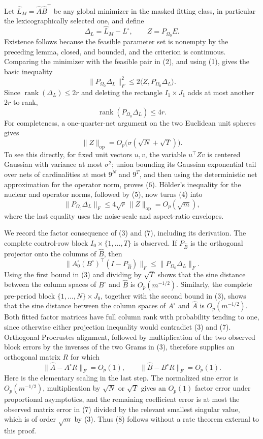 Let \(\widehat L_M=\widehat A\widehat B^{\top}\) be any global minimizer in the masked fitting class, in particular the lexicographically selected one, and define
\[
 \Delta_L=\widehat L_M-L^\circ,\qquad Z=P_{\Omega_0}E.
\]
Existence follows because the feasible parameter set is nonempty by the preceding lemma, closed, and bounded, and the criterion is continuous.  Comparing the minimizer with the feasible pair in (2), and using (1), gives the basic inequality
\[
 \|P_{\Omega_0}\Delta_L\|_F^2
 \leq 2\langle Z,P_{\Omega_0}\Delta_L\rangle.
\tag{4}
\]
Since \(\operatorname{rank}(\Delta_L)\leq2r\) and deleting the rectangle \(I_1\times J_1\) adds at most another \(2r\) to rank,
\[
 \operatorname{rank}(P_{\Omega_0}\Delta_L)\leq4r.
\tag{5}
\]
For completeness, a one-quarter-net argument on the two Euclidean unit spheres gives
\[
 \|Z\|_{\mathrm{op}}=O_p\bigl(\sigma(\sqrt N+\sqrt T)\bigr).
\tag{6}
\]
To see this directly, for fixed unit vectors \(u,v\), the variable \(u^{\top}Zv\) is centered Gaussian with variance at most \(\sigma^2\); union bounding its Gaussian exponential tail over nets of cardinalities at most \(9^N\) and \(9^T\), and then using the deterministic net approximation for the operator norm, proves (6).  Hölder's inequality for the nuclear and operator norms, followed by (5), now turns (4) into
\[
 \|P_{\Omega_0}\Delta_L\|_F
 \leq4\sqrt r\,\|Z\|_{\mathrm{op}}
 =O_p(\sqrt m),
\tag{7}
\]
where the last equality uses the noise-scale and aspect-ratio envelopes.

We record the factor consequence of (3) and (7), including its derivation.  The complete control-row block \(I_0\times\{1,\ldots,T\}\) is observed.  If \(P_{\widehat B}\) is the orthogonal projector onto the columns of \(\widehat B\), then
\[
 \|A^\circ_0(B^\circ)^{\top}(I-P_{\widehat B})\|_F
 \leq \|P_{\Omega_0}\Delta_L\|_F.
\]
Using the first bound in (3) and dividing by \(\sqrt T\) shows that the sine distance between the column spaces of \(B^\circ\) and \(\widehat B\) is \(O_p(m^{-1/2})\).  Similarly, the complete pre-period block \(\{1,\ldots,N\}\times J_0\), together with the second bound in (3), shows that the sine distance between the column spaces of \(A^\circ\) and \(\widehat A\) is \(O_p(m^{-1/2})\).  Both fitted factor matrices have full column rank with probability tending to one, since otherwise either projection inequality would contradict (3) and (7).  Orthogonal Procrustes alignment, followed by multiplication of the two observed block errors by the inverses of the two Grams in (3), therefore supplies an orthogonal matrix \(R\) for which
\[
 \|\widehat A-A^\circ R\|_F=O_p(1),
 \qquad
 \|\widehat B-B^\circ R\|_F=O_p(1).
\tag{8}
\]
Here is the elementary scaling in the last step.  The normalized sine error is \(O_p(m^{-1/2})\), multiplication by \(\sqrt N\) or \(\sqrt T\) gives an \(O_p(1)\) factor error under proportional asymptotics, and the remaining coefficient error is at most the observed matrix error in (7) divided by the relevant smallest singular value, which is of order \(\sqrt m\) by (3).  Thus (8) follows without a rate theorem external to this proof.

